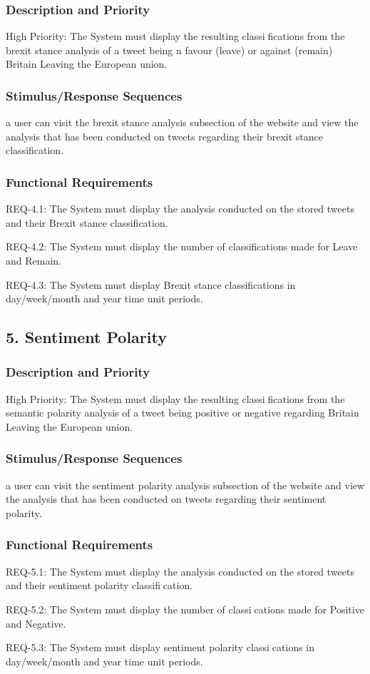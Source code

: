 \documentclass[11pt]{report}
\begin{document}
\subsubsection*{Description and Priority}
High Priority: The System must display the resulting classifications from the brexit stance analysis of a tweet being n favour (leave) or against (remain)  Britain Leaving the European union.

\subsubsection*{Stimulus/Response Sequences}
a user can visit the brexit stance analysis subsection of the website and view the analysis that has been conducted on tweets regarding their brexit stance classification.
\subsubsection*{Functional Requirements}
REQ-4.1:	The System must display the analysis conducted on the stored tweets and their Brexit stance classification.

REQ-4.2: The System must display the number of classifications made for Leave and Remain.

REQ-4.3: The System must display Brexit stance classifications in day/week/month and year time unit periods.

\subsection*{5. Sentiment Polarity}
\subsubsection*{Description and Priority}
High Priority: The System must display the resulting classifications from the semantic polarity analysis of a tweet being positive or negative regarding Britain Leaving the European union.
\subsubsection*{Stimulus/Response Sequences}
a user can visit the sentiment polarity analysis subsection of the website and view the analysis
that has been conducted on tweets regarding their sentiment polarity.
\subsubsection*{Functional Requirements}
REQ-5.1: The System must display the analysis conducted on the stored tweets and their sentiment polarity classification.

REQ-5.2: The System must display the number of classications made for Positive and Negative.

REQ-5.3: The System must display sentiment polarity classications in day/week/month and year time unit periods.
\end{document}
